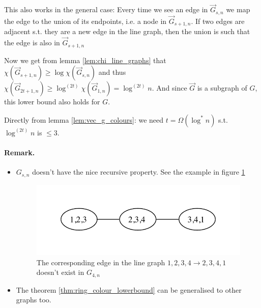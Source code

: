 \begin{pr}
\begin{enumerate}
This also works in the general case: Every time we see an edge in $\vec G_{s,n}$ we map the edge to the union of its endpoints, i.e. a node in $\vec G_{s+1,n}$. If two edges are adjacent s.t. they are a new edge in the line graph, then the union is such that the edge is also in $\vec G_{s+1,n}$

Now we get from lemma \ref{lem:chi_line_graphs} that $\chi(\vec G_{s+1,n}) \geq \log \chi(\vec G_{s,n})$ and thus $\chi(\vec G_{2t+1,n}) \geq \log^{(2t)} \chi(\vec G_{1,n}) = \log^{(2t)} n$. And since $\vec G$ is a subgraph of $G$, this lower bound also holds for $G$. 
\end{enumerate}
\end{pr}

\begin{pr} Directly from lemma \ref{lem:vec_g_colours}: we need $t=\Omega(\log^* n)$ s.t. $\log^{(2t)} n$ is $\leq 3$.\end{pr}

\paragraph{Remark.}

\begin{itemize} 
\item$G_{s,n}$ doesn't have the nice recursive property. See the example in figure \ref{fig:g_3_counterex}

\begin{figure}[hbt]
\begin{center}
\includegraphics{./images/g_3_counterex}
\end{center}
\caption{The corresponding edge in the line graph $1,2,3,4 \rightarrow 2,3,4,1$ doesn't exist in $G_{4,n}$}
\label{fig:g_3_counterex}
\end{figure}

%
%
%
\item The theorem \ref{thm:ring_colour_lowerbound} can be generalised to other graphs too.
\end{itemize}

